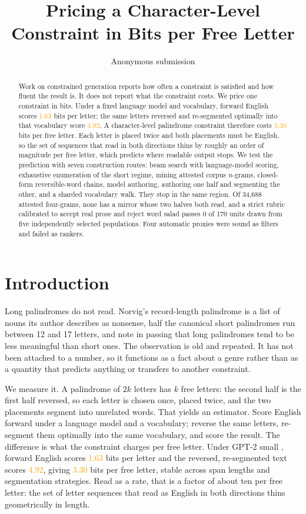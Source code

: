 \documentclass[11pt]{article}
\title{Pricing a Character-Level Constraint in Bits per Free Letter}
\author{Anonymous submission}
\newcommand{\stylenote}{}%
\newcommand{\stylenote}{\begin{center}\footnotesize\textcolor{red}%
    {Draft built without \texttt{acl.sty}. Layout and page count are not
     representative.}\end{center}}%
\newif\ifprovenance\provenancetrue
\newcommand{\unver}[1]{\ifprovenance\textcolor{orange}{#1}\else#1\fi}
\begin{document}
\maketitle
\stylenote

\begin{abstract}
Work on constrained generation reports how often a constraint is satisfied and
how fluent the result is. It does not report what the constraint costs. We
price one constraint in bits. Under a fixed language model and vocabulary,
forward English scores \unver{1.63} bits per letter; the same letters reversed
and re-segmented optimally into that vocabulary score \unver{4.92}. A
character-level palindrome constraint therefore costs \unver{3.30} bits per
free letter. Each letter is placed twice and both placements must be English,
so the set of sequences that read in both directions thins by roughly an order
of magnitude per free letter, which predicts where readable output stops. We
test the prediction with seven construction routes: beam search with
language-model scoring, exhaustive enumeration of the short regime, mining
attested corpus $n$-grams, closed-form reversible-word chains, model authoring,
authoring one half and segmenting the other, and a sharded vocabulary walk.
They stop in the same region. Of 34{,}688 attested four-grams, none has a
mirror whose two halves both read, and a strict rubric calibrated to accept
real prose and reject word salad passes 0 of 170 units drawn from five
independently selected populations. Four automatic proxies were sound as
filters and failed as rankers.
\end{abstract}

\section{Introduction}

Long palindromes do not read. Norvig's record-length palindrome is a list of
nouns its author describes as nonsense, half the canonical short palindromes
run between 12 and 17 letters, and \citet{papadopoulos2015} note in passing
that long palindromes tend to be less meaningful than short ones. The
observation is old and repeated. It has not been attached to a number, so it
functions as a fact about a genre rather than as a quantity that predicts
anything or transfers to another constraint.

We measure it. A palindrome of $2k$ letters has $k$ free letters: the second
half is the first half reversed, so each letter is chosen once, placed twice,
and the two placements segment into unrelated words. That yields an estimator.
Score English forward under a language model and a vocabulary; reverse the same
letters, re-segment them optimally into the same vocabulary, and score the
result. The difference is what the constraint charges per free letter. Under
GPT-2 small \citep{radford2019}, forward English scores \unver{1.63} bits per
letter and the reversed, re-segmented text scores \unver{4.92}, giving
\unver{3.30} bits per free letter, stable across span lengths and segmentation
strategies. Read as a rate, that is a factor of about ten per free letter: the
set of letter sequences that read as English in both directions thins
geometrically in length.
\end{document}
